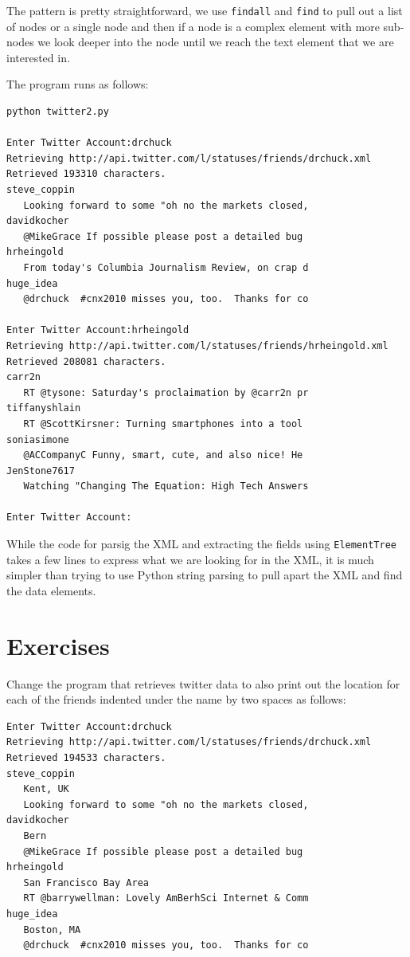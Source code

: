 The pattern is pretty straightforward, we use {\tt findall} and {\tt find}
to pull out a list of nodes or a single node and then if a node is a complex
element with more sub-nodes we look deeper into the node until we reach the 
text element that we are interested in.

The program runs as follows:

\beforeverb
\begin{verbatim}
python twitter2.py 

Enter Twitter Account:drchuck
Retrieving http://api.twitter.com/l/statuses/friends/drchuck.xml
Retrieved 193310 characters.
steve_coppin
   Looking forward to some "oh no the markets closed,
davidkocher
   @MikeGrace If possible please post a detailed bug 
hrheingold
   From today's Columbia Journalism Review, on crap d
huge_idea
   @drchuck  #cnx2010 misses you, too.  Thanks for co

Enter Twitter Account:hrheingold
Retrieving http://api.twitter.com/l/statuses/friends/hrheingold.xml
Retrieved 208081 characters.
carr2n
   RT @tysone: Saturday's proclaimation by @carr2n pr
tiffanyshlain
   RT @ScottKirsner: Turning smartphones into a tool 
soniasimone
   @ACCompanyC Funny, smart, cute, and also nice! He 
JenStone7617
   Watching "Changing The Equation: High Tech Answers

Enter Twitter Account:
\end{verbatim}
\afterverb
%
While the code for parsig the XML and extracting the fields
using {\tt ElementTree} takes a few lines to express what 
we are looking for in the XML, it is much simpler than trying 
to use Python string parsing to pull apart the XML and find 
the data elements.

\section{Exercises}

\begin{ex}
Change the program that retrieves twitter data to also
print out the location for each of the friends
indented under the name by two spaces as follows:

\beforeverb
\begin{verbatim}
Enter Twitter Account:drchuck
Retrieving http://api.twitter.com/l/statuses/friends/drchuck.xml
Retrieved 194533 characters.
steve_coppin
   Kent, UK
   Looking forward to some "oh no the markets closed,
davidkocher
   Bern
   @MikeGrace If possible please post a detailed bug 
hrheingold
   San Francisco Bay Area
   RT @barrywellman: Lovely AmBerhSci Internet & Comm
huge_idea
   Boston, MA
   @drchuck  #cnx2010 misses you, too.  Thanks for co
\end{verbatim}
\afterverb
%
\end{ex}

